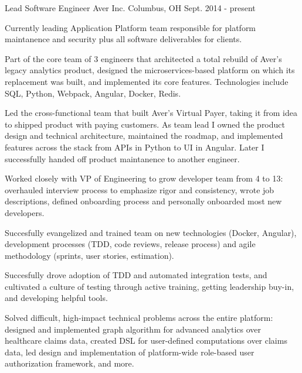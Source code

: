 

\begin{cventries}

  \cventry
    {Lead Software Engineer} %
    {Aver Inc.} %
    {Columbus, OH} %
    {Sept. 2014 - present} %
    {
      \begin{cvitems} %
        \item {Currently leading Application Platform team responsible for platform maintanence and security plus all software deliverables for clients.}
        \item {Part of the core team of 3 engineers that architected a total rebuild of Aver's legacy analytics product, designed the microservices-based platform on which its replacement was built, and implemented its core features. Technologies include SQL, Python, Webpack, Angular, Docker, Redis.}
        \item {Led the cross-functional team that built Aver's Virtual Payer, taking it from idea to shipped product with paying customers. As team lead I owned the product design and technical architecture, maintained the roadmap, and implemented features across the stack from APIs in Python to UI in Angular. Later I successfully handed off product maintanence to another engineer.}
        \item {Worked closely with VP of Engineering to grow developer team from 4 to 13: overhauled interview process to emphasize rigor and consistency, wrote job descriptions, defined onboarding process and personally onboarded most new developers.}
        \item {Succesfully evangelized and trained team on new technologies (Docker, Angular), development processes (TDD, code reviews, release process) and agile methodology (sprints, user stories, estimation). }
        \item {Succesfully drove adoption of TDD and automated integration tests, and cultivated a culture of testing through active training, getting leadership buy-in, and developing helpful tools. }
        \item {Solved difficult, high-impact technical problems across the entire platform: designed and implemented graph algorithm for advanced analytics over healthcare claims data, created DSL for user-defined computations over claims data, led design and implementation of platform-wide role-based user authorization framework, and more.}
      \end{cvitems}
    }


\end{cventries}
